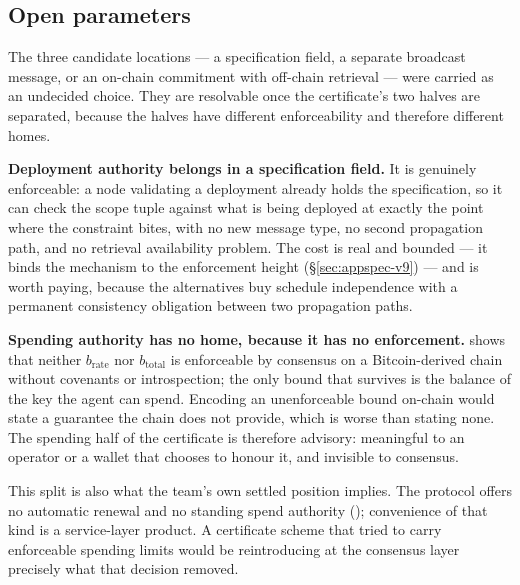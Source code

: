 \subsection{Open parameters}
\label{sec:agent-identity:open}

\begin{remark}
\label{rem:cert-location}
The three candidate locations --- a  specification field, a separate broadcast message, or an
on-chain commitment with off-chain retrieval --- were carried as an undecided choice. They are
resolvable once the certificate's two halves are separated, because the halves have different
enforceability and therefore different homes.

\textbf{Deployment authority belongs in a  specification field.} It is genuinely
enforceable: a node validating a deployment already holds the specification, so it can check the
scope tuple against what is being deployed at exactly the point where the constraint bites, with no
new message type, no second propagation path, and no retrieval availability problem. The cost is
real and bounded --- it binds the mechanism to the  enforcement height (\S\ref{sec:appspec-v9})
--- and is worth paying, because the alternatives buy schedule independence with a permanent
consistency obligation between two propagation paths.

\textbf{Spending authority has no home, because it has no enforcement.}
 shows that neither $b_{\mathrm{rate}}$ nor $b_{\mathrm{total}}$ is
enforceable by consensus on a Bitcoin-derived chain without covenants or introspection; the only
bound that survives is the balance of the key the agent can spend. Encoding an unenforceable bound
on-chain would state a guarantee the chain does not provide, which is worse than stating none. The
spending half of the certificate is therefore advisory: meaningful to an operator or a wallet that
chooses to honour it, and invisible to consensus.

This split is also what the team's own settled position implies. The protocol offers no automatic
renewal and no standing spend authority (); convenience of that kind
is a service-layer product. A certificate scheme that tried to carry enforceable spending limits
would be reintroducing at the consensus layer precisely what that decision removed.
\end{remark}

